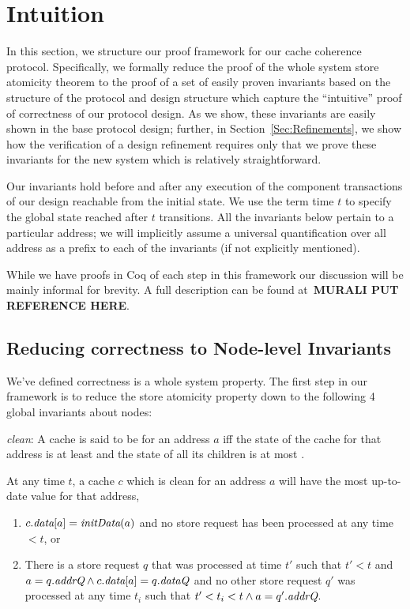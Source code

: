 \section{Intuition}
\label{Sec:ProofStructure}

In this section, we structure our proof framework for our cache
coherence protocol. Specifically, we formally reduce the proof of the
whole system store atomicity theorem to the proof of a set of easily
proven invariants based on the structure of the protocol and design
structure which capture the ``intuitive'' proof of correctness of our
protocol design. As we show, these invariants are easily shown in the
base protocol design; further, in Section~\ref{Sec:Refinements}, we
show how the verification of a design refinement requires only that we
prove these invariants for the new system which is relatively
straightforward.

Our invariants hold before and after any execution of the component
transactions of our design reachable from the initial state. We use
the term time $t$ to specify the global state reached after $t$
transitions.  All the invariants below pertain to a particular
address; we will implicitly assume a universal quantification over all
address as a prefix to each of the invariants (if not explicitly
mentioned).

While we have proofs in Coq of each step in this framework our
discussion will be mainly informal for brevity. A full description can
be found at~\textbf{MURALI PUT REFERENCE HERE}.

\subsection{Reducing correctness to Node-level Invariants}

We've defined correctness is a whole system property. The first step
in our framework is to reduce the store atomicity property down to the
following 4 global invariants about nodes:

\begin{defn}
\textit{clean}: A cache is said to be \clean{} for an address $a$ iff
the state of the cache for that address is at least \Sh{} and the
state of all its children is at most \Sh.
\end{defn}
\begin{inv}
At any time $t$, a cache $c$ which is clean for an address $a$ will have the most
up-to-date value for that address, \ie{}
\begin{enumerate}

\item $c.\textit{data}[a] = \textit{initData}(a)$ and no store request has been
  processed at any time $< t$, or

\item There is a store request $q$ that was processed at time $t'$ such that
$t' < t$ and $a = q.\textit{addrQ} \wedge c.\textit{data}[a] = q.\textit{dataQ}$ and no other store
request $q'$ was processed at any time $t_i$ such that $t' < t_i < t \wedge a =
q'.\textit{addrQ}$.
\end{enumerate}
\label{latestValue}
\end{inv}

